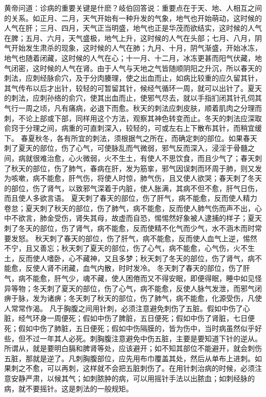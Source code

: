 \documentclass[a4paper,12pt,UTF8,twoside]{ctexbook}
\begin{document}
黄帝问道：诊病的重要关键是什麽？岐伯回答说：重要点在于天、地、人相互之间的关系。如正月、二月，天气开始有一种升发的气象，地气也开始萌动，这时候的人气在肝；三月、四月，天气正当明盛，地气也正是华茂而欲结实，这时候的人气在脾；五月、六月，天气盛极，地气上升，这时候的人气在头部；七月、八月，阴气开始发生肃杀的现象，这时候的人气在肺；九月、十月，阴气渐盛，开始冰冻，地气也随着闭藏，这时候的人气在心；十一月、十二月，冰冻更甚而阳气伏藏，地气闭密，这时候的人气在肾。由于人气与天地之气皆随顺阴阳之升沉，所以春天的刺法，应刺经脉俞穴，及于分肉腠理，使之出血而止，如病比较重的应久留其针，其气传布以后才出针，较轻的可暂留其针，候经气循环一周，就可以出针了。夏天的刺法，应刺孙络的俞穴，使其出血而止，使邪气尽去，就以手指扪闭其针孔伺其气行一周之顷，凡有痛病，必退下而愈。秋天的刺法应刺皮肤，顺着肌肉之分理而刺，不论上部或下部，同样用这个方法，观察其神色转变而止。冬天的刺法应深取俞窍于分理之间，病重的可直刺深入，较轻的，可或左右上下散布其针，而稍宜缓下。
春夏秋冬，各有所宜的刺法，须根据气之所在，而确定刺的部位。如果春天刺了夏天的部位，伤了心气，可使脉乱而气微弱，邪气反而深入，浸淫于骨髓之间，病就很难治愈，心火微弱，火不生土，有使人不思饮食，而且少气了；春天刺了秋天的部位，伤了肺气，春病在肝，发为筋挛，邪气因误刺而环周于肺，则又发为咳嗽，病不能愈，肝气伤，将使人时惊，肺气伤，且又使人欲哭；春天刺了冬天的部位，伤了肾气，以致邪气深着于内脏，使人胀满，其病不但不愈，肝气日伤，而且使人多欲言语。
夏天刺了春天的部位，伤了肝气，病不能愈，反而使人精力卷怠；夏天刺了秋天的部位，伤了肺气，病不能愈，反而使人肺气伤而声不出，心中不欲言，肺金受伤，肾失其母，故虚而自恐，惕惕然好象被人逮捕的样子；夏天刺了冬天的部位，伤了肾气，病不能愈，反而使精不化气而少气，水不涵木而时常要发怒。
秋天刺了春天的部位，伤了肝气，病不能愈，反而使人血气上逆，惕然不宁，且又善忘；秋天刺了夏天的部位，伤了心气，病不能愈，心气伤，火不生土，反而使人嗜卧，心不藏神，又且多梦；秋天刺了冬天的部位，伤了肾气，病不能愈，反使人肾不闭藏，血气内散，时时发冷。
冬天刺了春天的部位，伤了肝气，病不能愈，肝气少，魂不藏，使人困倦而又不得安眠，即便得眠，睡中如见怪异等物；冬天刺了夏天的部位，伤了心气，病不能愈，反使人脉气发泄，而邪气闭痹于脉，发为诸痹；冬天刺了秋天的部位，伤了肺气，病不能愈，化源受伤，凡使人常常作渴。
凡于胸腹之间用针刺，必须注意避免刺伤了五脏。假如中伤了心脏，经气环身一周便死；假如中伤了脾脏，五日便死；假如中伤了肾脏，七日便死；假如中伤了肺脏，五日便死；假如中伤隔膜的，皆为伤中，当时病虽然似乎好些，但不过一年其人必死。刺胸腹注意避免中伤五脏，主要是要知道下针的逆从。所谓从，就是要明白膈和脾肾等处，应该避开；如不知其部位不能避开，就会刺伤五脏，那就是逆了。凡刺胸腹部位，应先用布巾覆盖其处，然后从单布上进刺。如果刺之不愈，可以再刺，这样就不会把五脏刺伤了。在用针刺治病的时候，必须注意安静严肃，以候其气；如刺脓肿的病，可以用摇针手法以出脓血；如刺经脉的病，就不要摇针。这是刺法的一般规矩。
\end{document}
